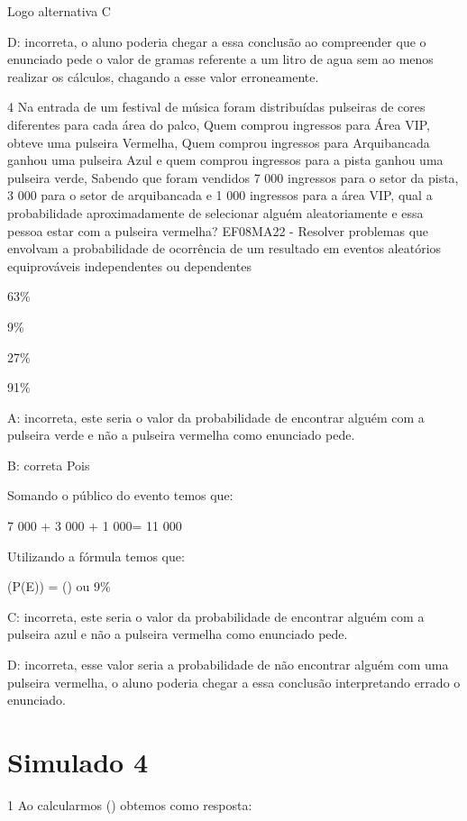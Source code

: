 Logo alternativa C

D: incorreta, o aluno poderia chegar a essa conclusão ao compreender que
o enunciado pede o valor de gramas referente a um litro de agua sem ao
menos realizar os cálculos, chagando a esse valor erroneamente.

\num{4} Na entrada de um festival de música foram distribuídas pulseiras de
cores diferentes para cada área do palco, Quem comprou ingressos para
Área VIP, obteve uma pulseira Vermelha, Quem comprou ingressos para
Arquibancada ganhou uma pulseira Azul e quem comprou ingressos para a
pista ganhou uma pulseira verde, Sabendo que foram vendidos 7 000
ingressos para o setor da pista, 3 000 para o setor de arquibancada e 1
000 ingressos para a área VIP, qual a probabilidade aproximadamente de
selecionar alguém aleatoriamente e essa pessoa estar com a pulseira
vermelha? EF08MA22 - Resolver problemas que envolvam a probabilidade de
ocorrência de um resultado em eventos aleatórios equiprováveis
independentes ou dependentes

\item 63\%
\item 9\%
\item 27\%
\item 91\%

A: incorreta, este seria o valor da probabilidade de encontrar alguém
com a pulseira verde e não a pulseira vermelha como enunciado pede.

B: correta Pois

Somando o público do evento temos que:

7 000 + 3 000 + 1 000= 11 000

Utilizando a fórmula temos que:

(P(E)) = () ou 9\%

C: incorreta, este seria o valor da probabilidade de encontrar alguém
com a pulseira azul e não a pulseira vermelha como enunciado pede.

D: incorreta, esse valor seria a probabilidade de não encontrar alguém
com uma pulseira vermelha, o aluno poderia chegar a essa conclusão
interpretando errado o enunciado.

\section{Simulado 4}

\num{1} Ao calcularmos () obtemos como resposta:

